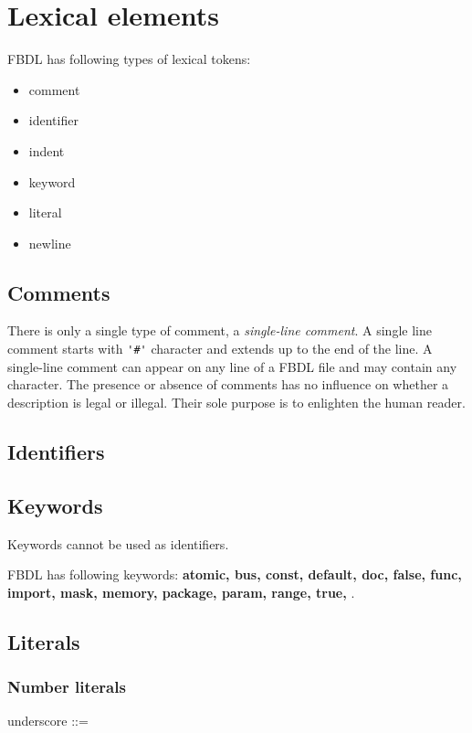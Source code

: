 \chapter{Lexical elements}

FBDL has following types of lexical tokens:
\begin{itemize}
	\item comment
	\item identifier
	\item indent
	\item keyword
	\item literal
	\item newline
\end{itemize}

\section{Comments}

There is only a single type of comment, a \textit{single-line comment}.
A single line comment starts with \lstinline{'#'} character and extends up to the end of the line.
A single-line comment can appear on any line of a FBDL file and may contain any character.
The presence or absence of comments has no influence on whether a description is legal or illegal.
Their sole purpose is to enlighten the human reader.

\section{Identifiers}

\section{Keywords}

Keywords cannot be used as identifiers.

FBDL has following keywords: \textbf{
atomic,
bus,
const,
default,
doc,
false,
func,
import,
mask,
memory,
package,
param,
range,
true,
}.

\section{Literals}

\subsection{Number literals}

\begin{bnf}
underscore ::= \tbf{\_}
\end{bnf}

